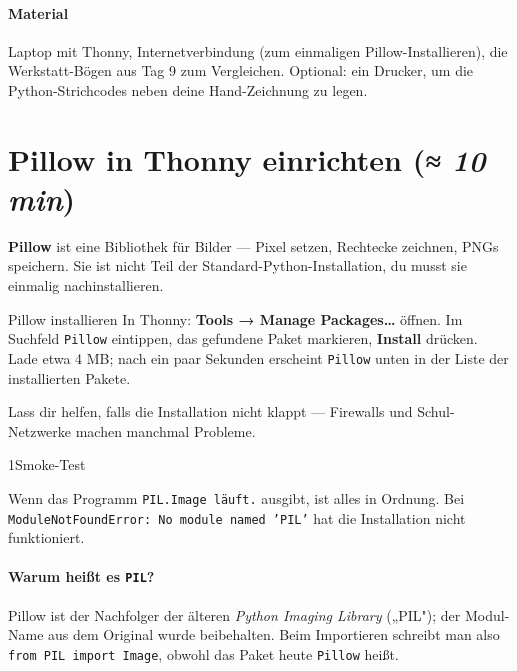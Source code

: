 \paragraph{Material} Laptop mit Thonny, Internetverbindung (zum
einmaligen Pillow-Installieren), die Werkstatt-Bögen aus Tag 9 zum
Vergleichen. Optional: ein Drucker, um die Python-Strichcodes neben
deine Hand-Zeichnung zu legen.

\section{Pillow in Thonny einrichten \normalfont(\textit{≈ 10 min})}

\textbf{Pillow} ist eine Bibliothek für Bilder — Pixel setzen,
Rechtecke zeichnen, PNGs speichern. Sie ist nicht Teil der
Standard-Python-Installation, du musst sie einmalig nachinstallieren.

\begin{werkzeugcheck}{Pillow installieren}
In Thonny: \textbf{Tools → Manage Packages\dots} öffnen. Im Suchfeld
\texttt{Pillow} eintippen, das gefundene Paket markieren,
\textbf{Install} drücken. Lade etwa 4 MB; nach ein paar Sekunden
erscheint \texttt{Pillow} unten in der Liste der installierten Pakete.

Lass dir helfen, falls die Installation nicht klappt — Firewalls und
Schul-Netzwerke machen manchmal Probleme.
\end{werkzeugcheck}

\begin{pythoneinheit}{1}{Smoke-Test}

Wenn das Programm \texttt{PIL.Image läuft.} ausgibt, ist alles in
Ordnung. Bei \texttt{ModuleNotFoundError: No module named 'PIL'} hat
die Installation nicht funktioniert.

\paragraph{Warum heißt es \texttt{PIL}?}
Pillow ist der Nachfolger der älteren \emph{Python Imaging Library}
(„PIL"); der Modul-Name aus dem Original wurde beibehalten. Beim
Importieren schreibt man also \texttt{from PIL import Image}, obwohl
das Paket heute \texttt{Pillow} heißt.
\end{pythoneinheit}

